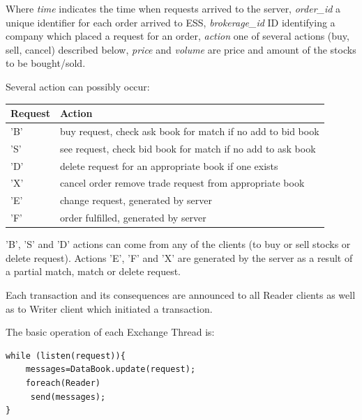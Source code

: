\documentclass[14pt]{article}
\begin{document}
Where \emph{time} indicates the time when requests arrived to the server, \emph{order\_id} a unique identifier for each order arrived to ESS, \emph{brokerage\_id} ID identifying a company which placed a request for an order, \emph{action} one of several actions (buy, sell, cancel) described below, \emph{price} and \emph{volume} are price and amount of the stocks to be bought/sold. 

Several action can possibly occur:

\begin{tabular}{|l|l|}
  \hline
  Request & Action \\ \hline
  'B' & buy request, check ask book for match if no add to bid book \\ \hline
  'S' & see request, check bid book for match if no add to ask book \\ \hline
  'D' & delete request for an appropriate book if one exists \\ \hline
  'X' & cancel order remove trade request from appropriate book\\ \hline
  'E' & change request, generated by server \\ \hline
  'F' & order fulfilled, generated by server \\
  \hline
\end{tabular}

'B', 'S' and 'D' actions can come from any of the clients (to buy or sell stocks or delete request). Actions 'E', 'F' and 'X' are generated by the server as a result of a partial match, match or delete request. 

Each transaction and its consequences are announced to all Reader clients as well as to Writer client which initiated a transaction. 

The basic operation of each Exchange Thread is:

\begin{verbatim}
while (listen(request)){
	messages=DataBook.update(request);
	foreach(Reader)
	 send(messages);
}
\end{verbatim}

\end{document}

